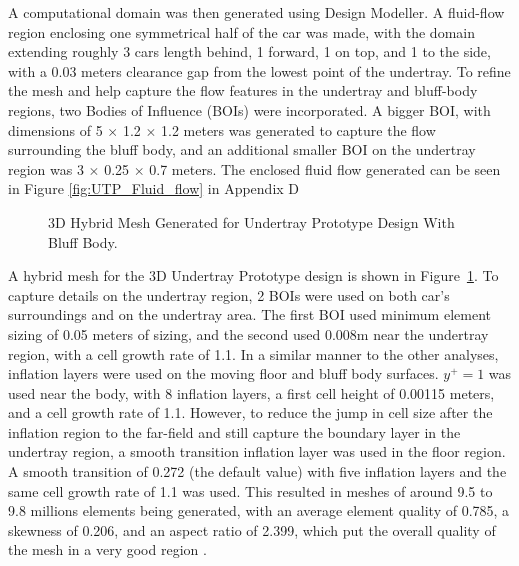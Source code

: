  \noindent A computational domain was then generated using Design Modeller. A fluid-flow region enclosing one symmetrical half of the car was made, with the domain extending roughly 3 cars length behind, 1 forward, 1 on top, and 1 to the side, with a 0.03 meters clearance gap from the lowest point of the undertray. To refine the mesh and help capture the flow features in the undertray and bluff-body regions, two Bodies of Influence (BOIs) were incorporated. A bigger BOI, with dimensions of 5 $\times$ 1.2 $\times$ 1.2 meters was generated to capture the flow surrounding the bluff body, and an additional smaller BOI on the undertray region was 3 $\times$ 0.25 $\times$ 0.7 meters. The enclosed fluid flow generated can be seen in Figure \ref{fig:UTP_Fluid_flow} in Appendix D
 
 \begin{figure}[!htb] 
    \centering
    \noindent{}
    \caption{3D Hybrid Mesh Generated for Undertray Prototype Design With Bluff Body.}
    \label{fig:3D_UT_MESH}
\end{figure}

\noindent A hybrid mesh for the 3D Undertray Prototype design is shown in Figure~\ref{fig:3D_UT_MESH}. To capture details on the undertray region, 2 BOIs were used on both car's surroundings and on the undertray area. The first BOI used minimum element sizing of 0.05 meters of sizing, and the second used 0.008m near the undertray region, with a cell growth rate of 1.1. In a similar manner to the other analyses, inflation layers were used on the moving floor and bluff body surfaces. $y^+ = 1$ was used near the body, with 8 inflation layers, a first cell height of 0.00115 meters, and a cell growth rate of 1.1. However, to reduce the jump in cell size after the inflation region to the far-field and still capture the boundary layer in the undertray region, a smooth transition inflation layer was used in the floor region. A smooth transition of 0.272 (the default value) with five inflation layers and the same cell growth rate of 1.1 was used. This resulted in meshes of around 9.5 to 9.8 millions elements being generated, with an average element quality of 0.785, a skewness of 0.206, and an aspect ratio of 2.399, which put the overall quality of the mesh in a very good region \cite{Ansys2006ModelingFlows}.   

